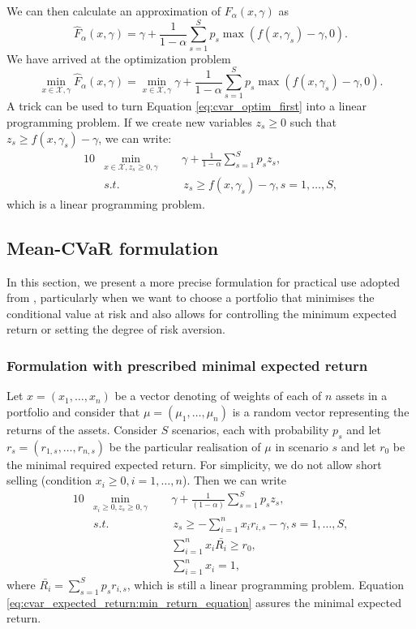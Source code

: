 We can then calculate an approximation of $F_{\alpha}(x,\gamma)$ as
\begin{equation}
\label{eq:cvar_approx_approx}
\hat{F}_{\alpha}(x,\gamma)=\gamma + \frac{1}{1-\alpha} \sum_{s=1}^S  p_s \max (f(x,\gamma_s)- \gamma,0).
\end{equation}
We have arrived at the optimization problem
\begin{equation}
\label{eq:cvar_optim_first}
\underset{x \in \mathcal{X}, \gamma}{\min} \hat{F}_{\alpha}(x,\gamma)= \underset{x \in \mathcal{X}, \gamma}{\min} \gamma + \frac{1}{1-\alpha} \sum_{s=1}^S p_s \max (f(x,\gamma_s)-\gamma,0).
\end{equation}
A trick can be used to turn Equation \ref{eq:cvar_optim_first} into a linear programming problem. If we create new variables $z_s \geq 0$ such that $z_s \geq f(x,\gamma_s)-\gamma$, we can write:
\begin{alignat}{10}
& \underset{x \in \mathcal{X}, z_s \geq 0, \gamma}{\min}  \, \, \, && \gamma + \frac{1}{1-\alpha} \sum_{s=1}^S p_s z_s, \\
&s.t. && \, z_s \geq f(x,\gamma_s)-\gamma, s=1,\dots,S,
\end{alignat}
which is a linear programming problem.
\subsection{Mean-CVaR formulation}
In this section, we present a more precise formulation for practical use adopted from \cite{cvar_robust_mean_cvar_portfolio_optimization}, particularly when we want to choose a portfolio that minimises the conditional value at risk and also allows for controlling the minimum expected return or setting the degree of risk aversion.
\subsubsection*{Formulation with prescribed minimal expected return}
Let $x=(x_1,\dots,x_n)$ be a vector denoting of weights of each of $n$ assets in a portfolio and consider that $\mu=(\mu_1,\dots,\mu_n)$ is a random vector representing the returns of the assets. Consider $S$ scenarios, each with probability $p_s$ and let $r_s = (r_{1,s},\dots,r_{n,s})$ be the particular realisation of $\mu$ in scenario $s$ and let $r_0$ be the minimal required expected return. For simplicity, we do not allow short selling (condition $x_i \geq 0, i=1,\dots,n$). Then we can write
\begin{alignat}{10}
& \underset{x_i \geq 0 , z_s \geq 0, \gamma}{\min}  \, \, \, && \gamma + \frac{1}{(1-\alpha)} \sum_{s=1}^S p_s z_s, \label{cvar_expected_return}  \\
&s.t. && \, z_s \geq  -\sum_{i=1}^{n} x_i r_{i,s} -\gamma, s=1,\dots,S, \nonumber \\
&  && \sum_{i=1}^{n} x_i \bar{R_i} \geq r_0, \label{eq:cvar_expected_return:min_return_equation} \\
&  && \sum_{i=1}^{n} x_i = 1, \nonumber
\end{alignat}
where $\bar{R_i}=\sum_{s=1}^{S}p_s r_{i,s}$, which is still a linear programming problem. Equation \ref{eq:cvar_expected_return:min_return_equation} assures the minimal expected return.
